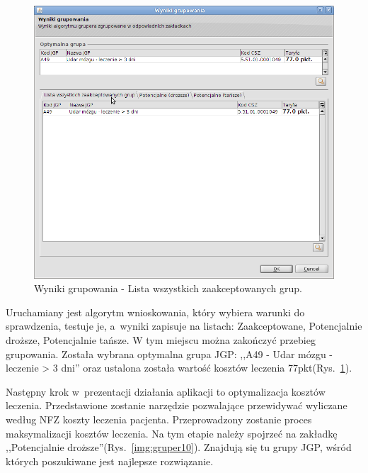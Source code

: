 \begin{figure}%
\centering
\includegraphics[scale=0.4]{images/gruper9}
\caption[Widok grupera]{Wyniki grupowania - Lista wszystkich zaakceptowanych grup.}
\label{img:gruper9}
\end{figure}

Uruchamiany jest algorytm wnioskowania, który wybiera warunki do sprawdzenia, testuje je, a~wyniki zapisuje na listach: Zaakceptowane, Potencjalnie droższe, Potencjalnie tańsze. W tym miejscu można zakończyć przebieg grupowania. Została wybrana optymalna grupa JGP: ,,A49 - Udar mózgu - leczenie > 3 dni'' oraz ustalona została wartość kosztów leczenia 77pkt(Rys.~\ref{img:gruper9}).

Następny krok w~prezentacji działania aplikacji to optymalizacja kosztów leczenia. Przedstawione zostanie narzędzie pozwalające przewidywać wyliczane według NFZ koszty leczenia pacjenta. Przeprowadzony zostanie proces maksymalizacji kosztów leczenia. Na tym etapie należy spojrzeć na zakładkę ,,Potencjalnie droższe''(Rys.~\ref{img:gruper10}). Znajdują się tu grupy JGP, wśród których poszukiwane jest najlepsze rozwiązanie.

